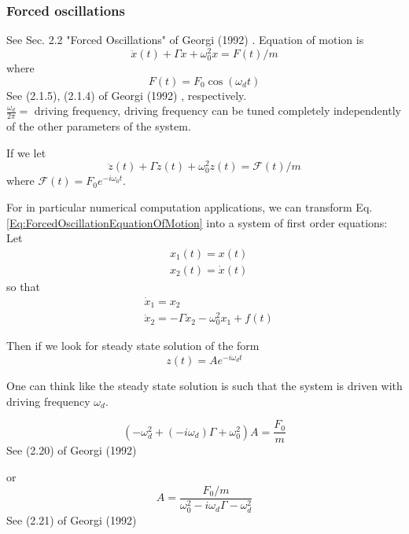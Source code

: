 \documentclass[10pt]{amsart}
\begin{document}
\begin{multicols*}{2}
\subsubsection{Forced oscillations} See Sec. 2.2 "Forced Oscillations" of Georgi (1992) \cite{Geor1992}.
Equation of motion is
\begin{equation}\label{Eq:ForcedOscillationEquationOfMotion}
	\ddot{x}(t) + \Gamma \dot{x} + \omega_0^2 x = F(t) /m 
\end{equation}
where
\begin{equation}
	F(t) = F_0 \cos{(\omega_dt)}
\end{equation}
See (2.1.5), (2.1.4) of Georgi (1992) \cite{Geor1992}, respectively. \\

$\frac{\omega_d}{2\pi} = $ driving frequency, driving frequency can be tuned completely independently of the other parameters of the system.

If we let 
\[
\ddot{z}(t) + \Gamma \dot{z}(t) + \omega_0^2 z(t) = \mathcal{F}(t) /m
\]
where $\mathcal{F}(t) = F_0 e^{-i \omega_0 t}$.

For in particular numerical computation applications, we can transform Eq. \ref{Eq:ForcedOscillationEquationOfMotion} into a system of first order equations: \\
Let 
\[
\begin{aligned}
& x_1(t) = x(t) \\
& x_2(t) = \dot{x}(t)
\end{aligned}
\]
so that
\[
\begin{aligned}
& \dot{x}_1 = x_2 \\
& \dot{x}_2 = -\Gamma x_2 - \omega_0^2 x_1 + f(t)
\end{aligned}
\]


Then if we look for steady state solution of the form
\[
z(t) = A e^{-i \omega_d t}
\]

One can think like the steady state solution is such that the system is driven with driving frequency $\omega_d$.

\begin{equation}
	(-\omega_d^2 + (-i \omega_d)\Gamma + \omega_0^2)A = \frac{F_0}{m} 
\end{equation}
See (2.20) of Georgi (1992) \cite{Geor1992}

or
\begin{equation}
	A = \frac{ F_0 / m }{ \omega_0^2 - i\omega_d \Gamma - \omega_d^2}
\end{equation}
See (2.21) of Georgi (1992) \cite{Geor1992}


\end{multicols*}
\end{document}
